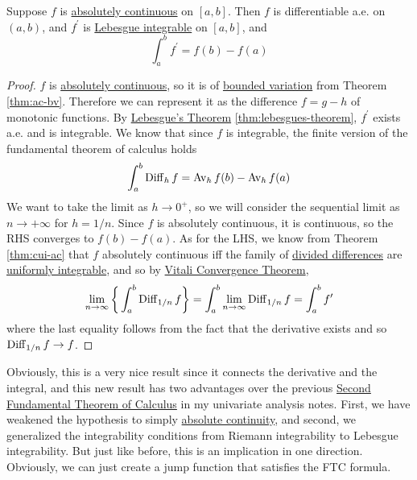   \begin{theorem}
    \label{thm:second-fundamental-theorem-of-calculus}
		Suppose $f$ is \hyperref[def:absolutely-continuous-function]{absolutely continuous} on $[a, b]$. Then $f$ is differentiable a.e. on $(a, b)$, and $f^\prime$ is \hyperref[def:leb-int-signed]{Lebesgue integrable} on $[a, b]$, and 
    \begin{equation}
      \int_a^b f^\prime = f(b) - f(a)
    \end{equation}
  \end{theorem}
  \begin{proof}
    $f$ is \hyperref[def:absolutely-continuous-function]{absolutely continuous}, so it is of \hyperref[def:bounded-variation]{bounded variation} from Theorem \ref{thm:ac-bv}. Therefore we can represent it as the difference $f = g - h$ of monotonic functions. By \hyperref[thm:lebesgues-theorem]{Lebesgue's Theorem} \ref{thm:lebesgues-theorem}, $f^\prime$ exists a.e. and is integrable. We know that since $f$ is integrable, the finite version of the fundamental theorem of calculus holds 
    \begin{equation}
      \int_a^b \operatorname{Diff}_h f = \operatorname{Av}_h f(b) - \operatorname{Av}_h f(a)
    \end{equation}
    We want to take the limit as $h \to 0^+$, so we will consider the sequential limit as $n \to +\infty$ for $h = 1/n$. 
    Since $f$ is absolutely continuous, it is continuous, so the RHS converges to $f(b) - f(a)$. As for the LHS, we know from Theorem \ref{thm:cui-ac} that $f$ absolutely continuous iff the family of \hyperref[def:divided-difference-average-value]{divided differences} are \hyperref[def:uniformly-integrable]{uniformly integrable}, and so by \hyperref[thm:vitali-convergence-theorem]{Vitali Convergence Theorem}, 
    \begin{equation}
      \lim_{n \to \infty} \bigg\{ \int_a^b \operatorname{Diff}_{1/n} f \bigg\} =  \int_a^b \lim_{n \to \infty} \operatorname{Diff}_{1/n} f = \int_a^b f^\prime 
    \end{equation}
    where the last equality follows from the fact that the derivative exists and so $\operatorname{Diff}_{1/n} f \to f$. 
  \end{proof} 

  Obviously, this is a very nice result since it connects the derivative and the integral, and this new result has two advantages over the previous \hyperref[real-thm:ftc2]{Second Fundamental Theorem of Calculus} in my univariate analysis notes. First, we have weakened the hypothesis to simply \hyperref[def:absolutely-continuous-function]{absolute continuity}, and second, we generalized the integrability conditions from Riemann integrability to Lebesgue integrability. But just like before, this is an implication in one direction. Obviously, we can just create a jump function that satisfies the FTC formula. 

